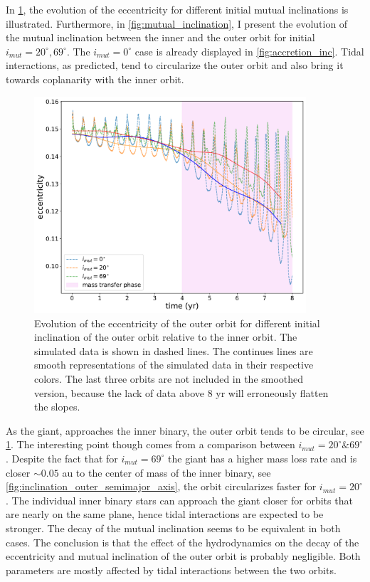 In \cref{fig:inclination_outer_ecc},  the evolution of the eccentricity for different initial mutual inclinations is illustrated. Furthermore, in \cref{fig:mutual_inclination}, I present the evolution of the mutual inclination between the inner and the outer orbit for initial $i_{mut} = 20^{\circ}, 69^{\circ}$. The $i_{mut} = 0^{\circ}$ case is already displayed in \cref{fig:accretion_inc}.  Tidal interactions, as predicted, tend to circularize the outer orbit and also bring it towards coplanarity with the inner orbit.
\begin{figure}[H]
    \centering
    \includegraphics[width=0.9\textwidth]{Thesis/graphs/inclination_case/inclination_outer_ecc.pdf}
    \caption{Evolution of the eccentricity of the outer orbit for different initial inclination of the outer orbit relative to the inner orbit. The simulated data is shown in dashed lines. The continues lines are smooth representations of the simulated data in their respective colors. The last three orbits are not included in the smoothed version, because the lack of data above $8$ yr will erroneously flatten the slopes.}
    \label{fig:inclination_outer_ecc}
\end{figure}
As the giant, approaches the inner binary, the outer orbit tends to be circular, see \cref{fig:inclination_outer_ecc}. The interesting point though comes from a comparison between $i_{mut} = 20^{\circ} \& 69^{\circ}$. Despite the fact that for $i_{mut} = 69^{\circ}$ the giant has a higher mass loss rate and is closer $\sim 0.05$ au to the center of mass of the inner binary, see \cref{fig:inclination_outer_semimajor_axis}, the orbit circularizes faster for $i_{mut} = 20^{\circ}$. The individual inner binary stars can approach the giant closer for orbits that are nearly on the same plane, hence tidal interactions are expected to be stronger. The decay of the mutual inclination seems to be equivalent in both cases. The conclusion is that the effect of the hydrodynamics on the decay of the eccentricity and mutual inclination of the outer orbit is probably negligible. Both parameters are mostly affected by tidal interactions between the two orbits.
